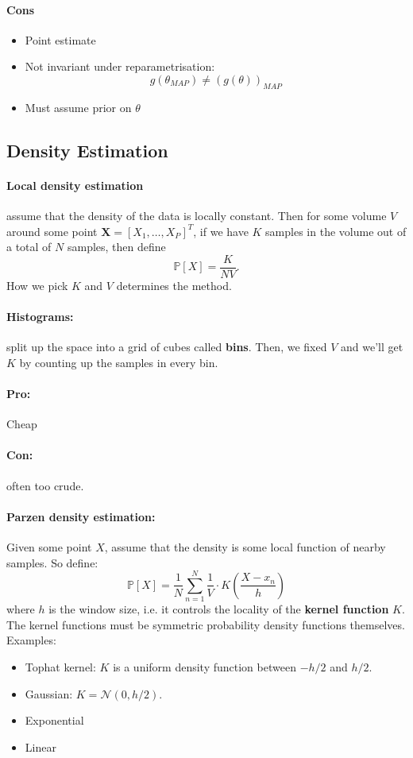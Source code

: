\documentclass{article}
\renewcommand{\vec}[1]{\mathbf{#1}}
\renewcommand{\|}{\,\,|\,\,}
\newcommand{\Prob}{\mathbb{P}}
\begin{document}
\paragraph{Cons}
\begin{itemize}
\item Point estimate
\item Not invariant under reparametrisation:
  \[
    g(\theta_{MAP}) \neq (g(\theta))_{MAP}
  \]
\item Must assume prior on $\theta$
\end{itemize}
\subsection{Density Estimation}
\paragraph{Local density estimation}
assume that the density of the data is locally constant. Then for some volume
$V$ around some point $\vec{X} = [X_1, \hdots, X_P]^T$, if we have $K$ samples
in the volume out of a total of $N$ samples, then define
\[
  \Prob[X] = \frac{K}{NV}.
\]
How we pick $K$ and $V$ determines the method.
\paragraph{Histograms:} split up the space into a grid of cubes called
\textbf{bins}. Then, we fixed $V$ and we'll get $K$ by counting up the samples
in every bin.
\paragraph{Pro:} Cheap
\paragraph{Con:} often too crude.
\paragraph{Parzen density estimation:} Given some point $X$, assume that the
density is some local function of nearby samples. So define:
\[
  \Prob[X] = \frac1N \sum_{n = 1}^N \frac1V \cdot K\left( \frac{X - x_n}{h} \right)
\]
where $h$ is the window size, i.e. it controls the locality of the
\textbf{kernel function} $K$.
The kernel functions must be symmetric probability density functions
themselves.\\
Examples:
\begin{itemize}
\item Tophat kernel: $K$ is a uniform density function between $-h/2$ and $h/2$.
\item Gaussian: $K = \mathcal{N}(0, h/2)$.
\item Exponential
\item Linear
\end{itemize}
\end{document}
